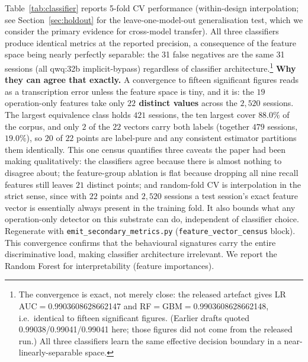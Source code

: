 \documentclass{article}
\begin{document}
Table~\ref{tab:classifier} reports 5-fold CV performance (within-design interpolation; see Section~\ref{sec:holdout} for the leave-one-model-out generalisation test, which we consider the primary evidence for cross-model transfer). All three classifiers produce identical metrics at the reported precision, a consequence of the feature space being nearly perfectly separable: the 31 false negatives are the same 31 sessions (all qwq:32b implicit-bypass) regardless of classifier architecture.\footnote{The convergence is exact, not merely close: the released artefact gives LR AUC$=$0.9903608628662147 and RF$=$GBM$=$0.9903608628662148, i.e.\ identical to fifteen significant figures. (Earlier drafts quoted 0.99038/0.99041/0.99041 here; those figures did not come from the released run.) All three classifiers learn the same effective decision boundary in a near-linearly-separable space.} \textbf{Why they can agree that exactly.} A convergence to fifteen significant figures reads as a transcription error unless the feature space is tiny, and it is: the $19$ operation-only features take only \textbf{$22$ distinct values} across the $2{,}520$ sessions. The largest equivalence class holds $421$ sessions, the ten largest cover $88.0\%$ of the corpus, and only \textbf{$2$} of the $22$ vectors carry both labels (together $479$ sessions, $19.0\%$), so $20$ of $22$ points are label-pure and any consistent estimator partitions them identically. This one census quantifies three caveats the paper had been making qualitatively: the classifiers agree because there is almost nothing to disagree about; the feature-group ablation is flat because dropping all nine recall features still leaves $21$ distinct points; and random-fold CV is interpolation in the strict sense, since with $22$ points and $2{,}520$ sessions a test session's exact feature vector is essentially always present in the training fold. It also bounds what any operation-only detector on this substrate can do, independent of classifier choice. Regenerate with \texttt{emit\_secondary\_metrics.py} (\texttt{feature\_vector\_census} block). This convergence confirms that the behavioural signatures carry the entire discriminative load, making classifier architecture irrelevant. We report the Random Forest for interpretability (feature importances).
\end{document}
